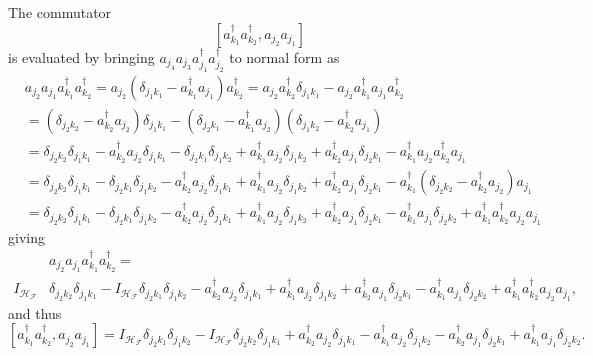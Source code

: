 \documentclass[aps,preprint,amsfonts,amssymb,showpacs,showkeys]{revtex4}%
\begin{document}
The commutator%
\begin{equation}
\left[  a_{k_{1}}^{\dagger}a_{k_{2}}^{\dagger},a_{j_{2}}a_{j_{1}}\right]
\end{equation}
is evaluated by bringing $a_{j_{4}}a_{j_{3}}a_{j_{1}}^{\dagger}a_{j_{2}%
}^{\dagger}$ to normal form as%
\begin{align}
&  a_{j_{2}}a_{j_{1}}a_{k_{1}}^{\dagger}a_{k_{2}}^{\dagger}=a_{j_{2}}\left(
\delta_{j_{1}k_{1}}-a_{k_{1}}^{\dagger}a_{j_{1}}\right)  a_{k_{2}}^{\dagger
}=a_{j_{2}}a_{k_{2}}^{\dagger}\delta_{j_{1}k_{1}}-a_{j_{2}}a_{k_{1}}^{\dagger
}a_{j_{1}}a_{k_{2}}^{\dagger}\nonumber\\
&  =\left(  \delta_{j_{2}k_{2}}-a_{k_{2}}^{\dagger}a_{j_{2}}\right)
\delta_{j_{1}k_{1}}-\left(  \delta_{j_{2}k_{1}}-a_{k_{1}}^{\dagger}a_{j_{2}%
}\right)  \left(  \delta_{j_{1}k_{2}}-a_{k_{2}}^{\dagger}a_{j_{1}}\right)
\nonumber\\
&  =\delta_{j_{2}k_{2}}\delta_{j_{1}k_{1}}-a_{k_{2}}^{\dagger}a_{j_{2}}%
\delta_{j_{1}k_{1}}-\delta_{j_{2}k_{1}}\delta_{j_{1}k_{2}}+a_{k_{1}}^{\dagger
}a_{j_{2}}\delta_{j_{1}k_{2}}+a_{k_{2}}^{\dagger}a_{j_{1}}\delta_{j_{2}k_{1}%
}-a_{k_{1}}^{\dagger}a_{j_{2}}a_{k_{2}}^{\dagger}a_{j_{1}}\nonumber\\
&  =\delta_{j_{2}k_{2}}\delta_{j_{1}k_{1}}-\delta_{j_{2}k_{1}}\delta
_{j_{1}k_{2}}-a_{k_{2}}^{\dagger}a_{j_{2}}\delta_{j_{1}k_{1}}+a_{k_{1}%
}^{\dagger}a_{j_{2}}\delta_{j_{1}k_{2}}+a_{k_{2}}^{\dagger}a_{j_{1}}%
\delta_{j_{2}k_{1}}-a_{k_{1}}^{\dagger}\left(  \delta_{j_{2}k_{2}}-a_{k_{2}%
}^{\dagger}a_{j_{2}}\right)  a_{j_{1}}\nonumber\\
&  =\delta_{j_{2}k_{2}}\delta_{j_{1}k_{1}}-\delta_{j_{2}k_{1}}\delta
_{j_{1}k_{2}}-a_{k_{2}}^{\dagger}a_{j_{2}}\delta_{j_{1}k_{1}}+a_{k_{1}%
}^{\dagger}a_{j_{2}}\delta_{j_{1}k_{2}}+a_{k_{2}}^{\dagger}a_{j_{1}}%
\delta_{j_{2}k_{1}}-a_{k_{1}}^{\dagger}a_{j_{1}}\delta_{j_{2}k_{2}}+a_{k_{1}%
}^{\dagger}a_{k_{2}}^{\dagger}a_{j_{2}}a_{j_{1}}%
\end{align}
giving
\begin{align}
&  a_{j_{2}}a_{j_{1}}a_{k_{1}}^{\dagger}a_{k_{2}}^{\dagger}=\nonumber\\
I_{\mathcal{H}_{\mathcal{F}}}  &  \delta_{j_{2}k_{2}}\delta_{j_{1}k_{1}%
}-I_{\mathcal{H}_{\mathcal{F}}}\delta_{j_{2}k_{1}}\delta_{j_{1}k_{2}}%
-a_{k_{2}}^{\dagger}a_{j_{2}}\delta_{j_{1}k_{1}}+a_{k_{1}}^{\dagger}a_{j_{2}%
}\delta_{j_{1}k_{2}}+a_{k_{2}}^{\dagger}a_{j_{1}}\delta_{j_{2}k_{1}}-a_{k_{1}%
}^{\dagger}a_{j_{1}}\delta_{j_{2}k_{2}}+a_{k_{1}}^{\dagger}a_{k_{2}}^{\dagger
}a_{j_{2}}a_{j_{1}},
\end{align}
and thus
\begin{equation}
\left[  a_{k_{1}}^{\dagger}a_{k_{2}}^{\dagger},a_{j_{2}}a_{j_{1}}\right]
=I_{\mathcal{H}_{\mathcal{F}}}\delta_{j_{2}k_{1}}\delta_{j_{1}k_{2}%
}-I_{\mathcal{H}_{\mathcal{F}}}\delta_{j_{2}k_{2}}\delta_{j_{1}k_{1}}%
+a_{k_{2}}^{\dagger}a_{j_{2}}\delta_{j_{1}k_{1}}-a_{k_{1}}^{\dagger}a_{j_{2}%
}\delta_{j_{1}k_{2}}-a_{k_{2}}^{\dagger}a_{j_{1}}\delta_{j_{2}k_{1}}+a_{k_{1}%
}^{\dagger}a_{j_{1}}\delta_{j_{2}k_{2}}.
\end{equation}
\end{document}
